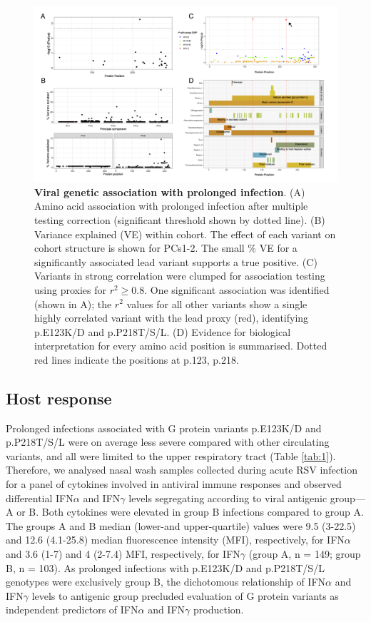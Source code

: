 \documentclass{article} %
\begin{document}
\begin{figure}[ht] \hspace{-1.5cm} 
    \includegraphics[scale=0.9]{f4}
	\caption{\textbf{Viral genetic association with prolonged infection}. 
	(A) Amino acid association with prolonged infection after multiple testing correction (significant threshold shown by dotted line). (B) Variance explained (VE) within cohort. The effect of each variant on cohort structure is shown for PCs1-2. The small \% VE for a significantly associated lead variant supports a true positive. (C) Variants in strong correlation were clumped for association testing using proxies for $r^2 \ge 0.8$. One significant association was identified (shown in A); the $r^2$ values for all other variants show a single highly correlated variant with the lead proxy (red), identifying p.E123K/D and p.P218T/S/L. (D) Evidence for biological interpretation for every amino acid position is summarised. Dotted red lines indicate the positions at p.123, p.218.}
	\label{fig:3}
\end{figure}
\clearpage

\subsection{Host response}
Prolonged infections associated with G protein variants p.E123K/D and p.P218T/S/L were on average less severe compared with other circulating variants, and all were limited to the upper respiratory tract (Table \ref{tab:1}). 
Therefore, we analysed nasal wash samples collected during acute RSV infection for a panel of cytokines involved in antiviral immune responses and observed differential IFN$\alpha$ and IFN$\gamma$ levels segregating according to viral antigenic group—A or B. 
Both cytokines were elevated in group B infections compared to group A. The groups A and B median (lower-and upper-quartile) values were 9.5 (3-22.5) and 12.6 (4.1-25.8) median fluorescence intensity (MFI), respectively, for IFN$\alpha$ and 3.6 (1-7) and 4 (2-7.4) MFI, respectively, for IFN$\gamma$ (group A, n = 149; group B, n = 103). 
As prolonged infections with p.E123K/D and p.P218T/S/L genotypes were exclusively group B, the dichotomous relationship of IFN$\alpha$ and IFN$\gamma$ levels to antigenic group precluded evaluation of G protein variants as independent predictors of IFN$\alpha$ and IFN$\gamma$ production.
\end{document}
